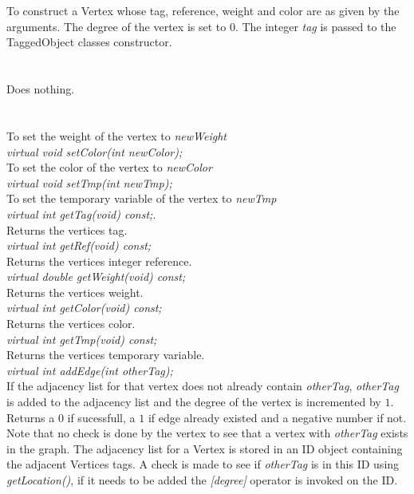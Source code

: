   \\
  \\
To construct a Vertex whose tag, reference, weight and color are as
given by the arguments. The degree of the vertex is set to $0$. The
integer {\em tag} is passed to the TaggedObject classes constructor.\\

  \\
  \\
Does nothing. \\

  \\
 \\
To set the weight of the vertex to {\em newWeight} \\    

{\em virtual void setColor(int newColor);} \\
To set the color of the vertex to {\em newColor} \\    

{\em virtual void setTmp(int newTmp);} \\
To set the temporary variable of the vertex to {\em newTmp} \\    

{\em virtual int getTag(void) const;}. \\
Returns the vertices tag.\\

{\em virtual int getRef(void) const; } \\
Returns the vertices integer reference.\\

{\em virtual double getWeight(void) const;} \\
Returns the vertices weight. \\

{\em virtual int getColor(void) const; } \\
Returns the vertices color. \\

{\em virtual int getTmp(void) const; } \\
Returns the vertices temporary variable. \\

{\em virtual int addEdge(int otherTag); } \\
If the adjacency list for that vertex does not already contain {\em
otherTag}, {\em otherTag} is added to the adjacency list and the
degree of the vertex is incremented by $1$. Returns a $0$ if
sucessfull, a $1$ if edge already existed and a negative number if
not. Note that no check is done by the vertex to see that a vertex
with {\em otherTag} exists in the graph. The adjacency list for a
Vertex is stored in an ID object containing the adjacent Vertices
tags. A check is made to see if {\em otherTag} is in this ID using
{\em getLocation()}, if it needs to be added the {\em [degree]}
operator is invoked on the ID. \\ 

